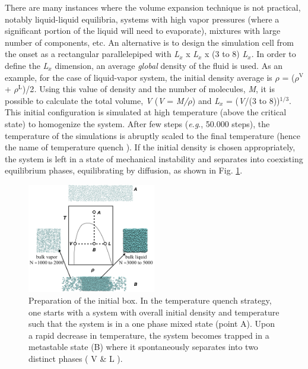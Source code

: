 \documentclass[9pt,bestpractices]{livecoms}
\begin{document}
There are many instances where the volume expansion technique is not practical,
notably liquid-liquid equilibria, systems with high vapor pressures (where
a significant portion of the liquid will need to evaporate), mixtures with
large number of components, etc.  An alternative is to design the simulation
cell from the onset as a rectangular parallelepiped with \textit{L}$_{x}$
x \textit{L}$_{x}$ x (3 to 8) \textit{L}$_{x}$. In order to define the
\textit{L}$_{x}$ dimension, an average \textit{global} density of the fluid is
used. As an example, for the case of liquid-vapor system, the initial density
average is ${\rho}$ = (${\rho}$$^{\mathrm{V}}$
+ ${\rho}$$^{\mathrm{L}}$)/2\textit{.} Using this value of density and the
number of molecules, \textit{M}, it is possible to calculate the total volume,
\textit{V} (\textit{V} = \textit{M/${\rho}$}) and \textit{L}$_{x}$
= (\textit{V}/(3 to 8))$^{\mathrm{1/3}}$. This initial configuration is
simulated at high temperature (above the critical state) to homogenize the
system. After few steps (\textit{e.g}., 50.000 steps), the temperature of the
simulations is abruptly scaled to the final temperature (hence the name of
temperature quench \citep{martinez2005}).  If the initial
density is chosen appropriately, the system is left in a state of mechanical
instability and separates into coexisting equilibrium phases, equilibrating by
diffusion, as shown in Fig. \ref{fig:6b}.

\begin{figure}
  \includegraphics[width=0.5\textwidth]{gfx/image19.png}
  \caption{Preparation of the initial box. In the temperature quench strategy, one starts with a system with overall initial density and temperature such that the system is in a one phase mixed state (point A). Upon a rapid decrease in temperature, the system becomes trapped in a metastable state (B) where it spontaneously separates into two distinct phases ( V \& L ). }
  \label{fig:6b}
\end{figure}
\end{document}
